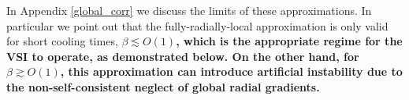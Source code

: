  In Appendix \ref{global_corr}  we discuss the limits of these approximations.
In particular we point out that the fully-radially-local approximation is only valid for
short cooling times, $\beta \lesssim O(1)${\bf, which is the 
  appropriate regime for the VSI to operate, as demonstrated below. 
  On the other hand, for
  $\beta\gtrsim O(1)$, this approximation can introduce artificial
  instability due to the non-self-consistent neglect of global radial gradients.}






